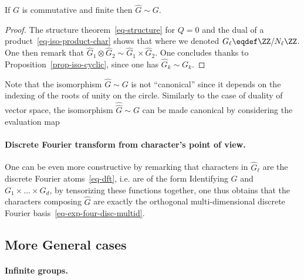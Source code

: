 \begin{prop}
	If $G$ is commutative and finite then $\hat G \sim G$.
\end{prop}
\begin{proof}
	The structure theorem~\eqref{eq-structure} for $Q=0$ and the dual of a product~\eqref{eq-iso-product-char} shows that 
	where we denoted $G_\ell \eqdef \ZZ/N_\ell\ZZ$. 
	One then remark that  $\hat G_1 \otimes \hat G_2 \sim \hat G_1 \times \hat G_2$.
	One concludes thanks to Proposition~\ref{prop-iso-cyclic}, since one has $\hat G_k \sim G_k$.
\end{proof}

Note that the isomorphism $\hat G \sim G$ is not ``canonical'' since it depends on the indexing of the roots of unity on the circle. Similarly to the case of duality of vector space, the isomorphism $\hat{\hat{G}} \sim G$ can be made canonical by considering the evaluation map

\paragraph{Discrete Fourier transform from character's point of view.}

One can be even more constructive by remarking that characters in $\hat G_\ell$ are the discrete Fourier atoms~\eqref{eq-dft}, i.e. are of the form 
Identifying $G$ and $G_1 \times \ldots \times G_d$, 
by tensorizing these functions together, one thus obtains that the characters composing $\hat G$ are exactly the orthogonal multi-dimensional discrete Fourier basis~\eqref{eq-exp-four-disc-multid}.

\subsection{More General cases}

\paragraph{Infinite groups.}

